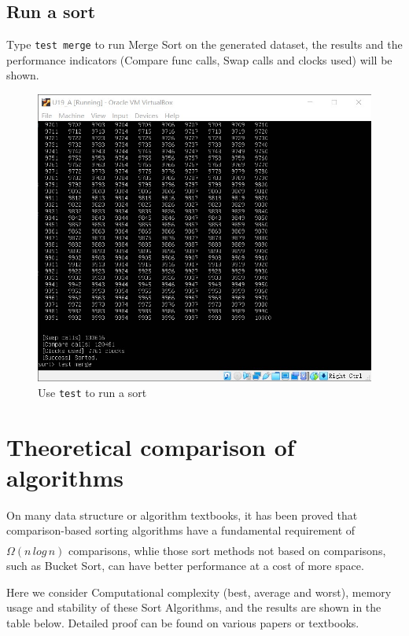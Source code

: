 \documentclass[cn,black,12pt,normal]{elegantnote}
\newcommand{\uct}[1]{\textsuperscript{\textsuperscript{\cite{#1}}}}
\begin{document}
\subsection{Run a sort}

Type \lstinline{test merge} to run Merge Sort on the generated dataset, the results and the performance indicators (Compare func calls, Swap calls and clocks used) will be shown.

\begin{figure}[H]
    \centering
    \includegraphics[width=0.7\linewidth]{image/sort_04.jpg}
    \caption{Use \lstinline{test} to run a sort}
\end{figure}

\section{Theoretical comparison of algorithms}

On many data structure or algorithm textbooks, it has been proved that comparison-based sorting algorithms have a fundamental requirement of $\Omega(n \, log \, n) $ comparisons,\uct{cormen2009introduction} whlie those sort methods not based on comparisons, such as Bucket Sort, can have better performance at a cost of more space.

Here we consider Computational complexity (best, average and worst), memory usage and stability of these Sort Algorithms, and the results are shown in the table below. Detailed proof can be found on various papers or textbooks.
\end{document}
